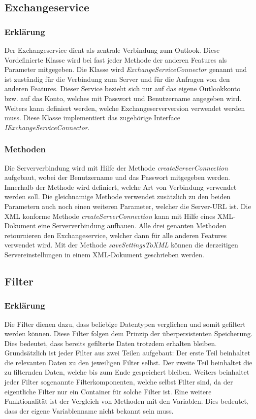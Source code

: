 \subsection{Exchangeservice}
\subsubsection{Erklärung}
Der Exchangeservice dient als zentrale Verbindung zum Outlook. Diese Vordefinierte Klasse wird bei fast jeder Methode der anderen Features als Parameter mitgegeben. Die Klasse wird \textit{ExchangeServiceConnector} genannt und ist zuständig für die Verbindung zum Server und für die Anfragen von den anderen Features. Dieser Service bezieht sich nur auf das eigene Outlookkonto bzw. auf das Konto, welches mit Passwort und Benutzername angegeben wird. Weiters kann definiert werden, welche Exchangeserverversion verwendet werden muss. Diese Klasse implementiert das zugehörige Interface \textit{IExchangeServiceConnector}.
\subsubsection{Methoden}
Die Serververbindung wird mit Hilfe der Methode \textit{createServerConnection} aufgebaut, wobei der Benutzername und das Passwort mitgegeben werden. Innerhalb der Methode wird definiert, welche Art von Verbindung verwendet werden soll. Die gleichnamige Methode verwendet zusätzlich zu den beiden Parametern auch noch einen weiteren Parameter, welcher die Server-URL ist. Die XML konforme Methode \textit{createServerConnection} kann mit Hilfe eines XML-Dokument eine Serververbindung aufbauen. Alle drei genanten Methoden retournieren den Exchangeservice, welcher dann für alle anderen Features verwendet wird. Mit der Methode \textit{saveSettingsToXML} können die derzeitigen Servereinstellungen in einem XML-Dokument geschrieben werden. 
\subsection{Filter}
\subsubsection{Erklärung}
Die Filter dienen dazu, dass beliebige Datentypen verglichen und somit gefiltert werden können. Diese Filter folgen dem Prinzip der überpersistenten Speicherung. Dies bedeutet, dass bereits gefilterte Daten trotzdem erhalten bleiben. Grundsätzlich ist jeder Filter aus zwei Teilen aufgebaut: Der erste Teil beinhaltet die relevanten Daten zu den jeweiligen Filter selbst. Der zweite Teil beinhaltet die zu filternden Daten, welche bis zum Ende gespeichert bleiben. Weiters beinhaltet jeder Filter sogenannte Filterkomponenten, welche selbst Filter sind, da der eigentliche Filter nur ein Container für solche Filter ist. Eine weitere Funktionalität ist der Vergleich von Methoden mit den Variablen. Dies bedeutet, dass der eigene Variablenname nicht bekannt sein muss. 
